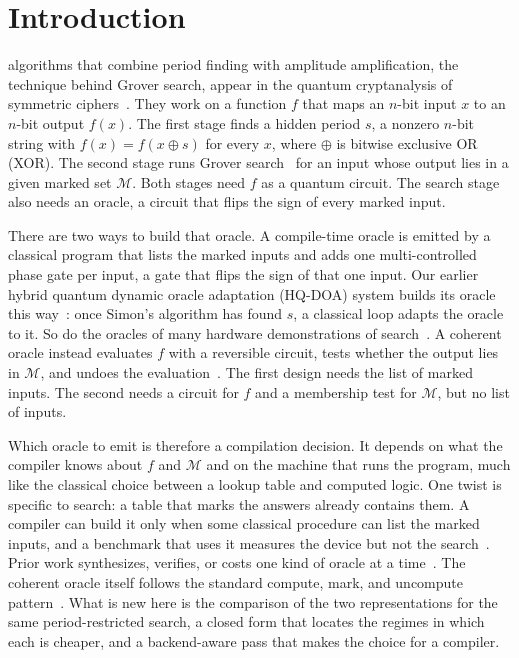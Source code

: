 \documentclass[journal]{IEEEtran}
\begin{document}

\section{Introduction}
\label{sec:intro}

 algorithms that combine period finding with amplitude
amplification, the technique behind Grover search, appear in the quantum
cryptanalysis of symmetric
ciphers~\cite{kaplan2016breaking,leander2017grover,bonnetain2019quantum,bonnetain2022quantum}.
They work on a function $f$ that maps an $n$-bit input $x$ to an $n$-bit output
$f(x)$. The first stage finds a hidden period $s$, a nonzero $n$-bit string with
$f(x)=f(x\oplus s)$ for every $x$, where $\oplus$ is bitwise exclusive OR (XOR). The second
stage runs Grover search~\cite{grover1996fast} for an input whose output lies in
a given marked set $\mathcal{M}$. Both stages need $f$ as a quantum circuit. The
search stage also needs an oracle, a circuit that flips the sign of every marked
input.

There are two ways to build that oracle. A compile-time oracle is emitted by a
classical program that lists the marked inputs and adds one multi-controlled
phase gate per input, a gate that flips the sign of that one input. Our earlier
hybrid quantum dynamic oracle adaptation (HQ-DOA) system builds its oracle this
way~\cite{patil2026quantum}: once Simon's algorithm has found $s$, a classical
loop adapts the oracle to it. So do the oracles of many hardware demonstrations
of search~\cite{figgatt2017complete,abughanem2025characterizing}. A coherent oracle
instead evaluates $f$ with a reversible circuit, tests whether the output lies in
$\mathcal{M}$, and undoes the evaluation~\cite{bennett1973logical}. The first
design needs the list of marked inputs. The second needs a circuit for $f$ and a
membership test for $\mathcal{M}$, but no list of inputs.

Which oracle to emit is therefore a compilation decision. It depends on what the
compiler knows about $f$ and $\mathcal{M}$ and on the machine that runs the program, much like the
classical choice between a lookup table and computed logic. One twist is
specific to search: a table that marks the answers already contains them. A
compiler can build it only when some classical procedure can list the marked
inputs, and a benchmark that uses it measures the device but not the
search~\cite{leymann2020bitter,johansson2019quantum}. Prior work synthesizes,
verifies, or costs one kind of oracle at a
time~\cite{soeken2019lut,bernasconi2023xor,seidel2023automatic,li2022verified,jaques2020implementing,chung2022alternative,zhang2024optimized,bonnetain2022quantum}.
The coherent oracle itself follows the standard compute, mark, and uncompute
pattern~\cite{bennett1973logical}. What is new here is the comparison of the two
representations for the same period-restricted search, a closed form that locates
the regimes in which each is cheaper, and a backend-aware pass that makes the
choice for a compiler.
\end{document}

